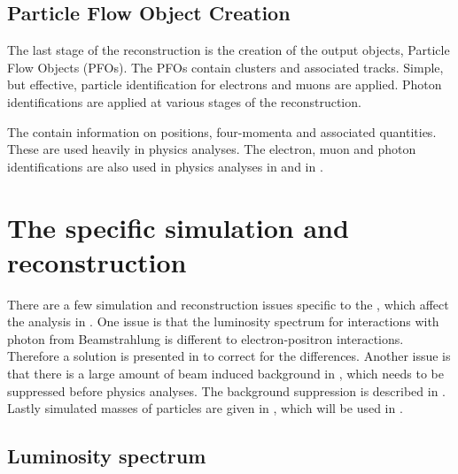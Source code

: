 \subsection{Particle Flow Object Creation}
\label{sec:pandoraPFOcreation}

The last stage of the reconstruction is the creation of the output objects, Particle Flow Objects (PFOs). The PFOs contain clusters and associated tracks. Simple, but effective, particle identification for electrons and muons are applied. Photon identifications are  applied at various stages of the reconstruction.

The \PFOs contain information on positions, four-momenta and associated quantities. These \PFOs are  used heavily in physics analyses. The electron, muon and photon identifications are  also used in physics analyses in  and in .


\section{The \CLIC specific simulation and reconstruction}

There are a few  simulation and reconstruction issues specific to the \CLIC, which affect the analysis in . One issue is that the luminosity spectrum for  interactions with photon from Beamstrahlung is different to electron-positron interactions. Therefore a solution is presented in  to correct for the differences. Another issue is that there is a large amount of beam induced background in \CLIC, which needs to be suppressed before physics analyses. The background suppression is described in . Lastly simulated masses of particles are given in , which will be used in .





\subsection{Luminosity spectrum}
\label{sec:pandoraCLUClumi}


